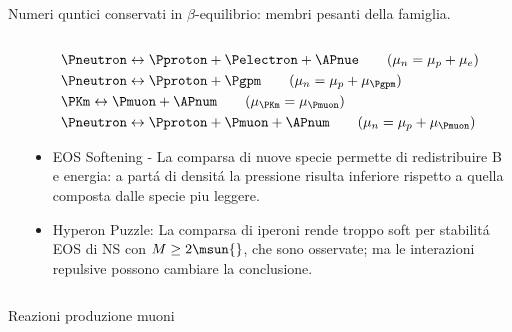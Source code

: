 \begin{frame}{Numeri quntici conservati in $\beta$-equilibrio: membri pesanti della famiglia.}
\begin{columns}[T]
\begin{column}{0.6\textwidth}
\begin{itemize}
            \end{itemize}
        \end{column}
        \begin{column}{0.4\textwidth}
            \begin{align*}
                &\Pneutron\leftrightarrow\Pproton+\Pelectron+\APnue\tag{$\mu_n=\mu_p+\mu_e$}\\
                &\Pneutron\leftrightarrow\Pproton+\Pgpm\tag{$\mu_n=\mu_p+\mu_{\Pgpm}$}\\
                &\PKm\leftrightarrow\Pmuon+\APnum\tag{$\mu_{\PKm}=\mu_{\Pmuon}$}\\
                &\Pneutron\leftrightarrow\Pproton+\Pmuon+\APnum\tag{$\mu_n=\mu_p+\mu_{\Pmuon}$}
            \end{align*}
            \begin{itemize}
                \item EOS Softening - La comparsa di nuove specie permette di redistribuire B e energia: a part\'a di densit\'a la pressione risulta inferiore rispetto a quella composta dalle specie piu leggere.
                \item Hyperon Puzzle: La comparsa di iperoni rende troppo soft per stabilit\'a EOS di NS con $M\geq2\msun{}$, che sono osservate; ma le interazioni repulsive possono cambiare la conclusione.
            \end{itemize}
        \end{column}
    \end{columns}

\end{frame}

\begin{frame}{Reazioni produzione muoni}
    \begin{table}
\centering
\scriptsize
{}
\caption{Processi deboli di produzione dei muoni nella materia
nucleare fredda, trasparente ai neutrini.
\(N=n,p\) indica un nucleone spettatore.
Le soglie indicano la comparsa termodinamica dei muoni,
non necessariamente l'apertura cinematica dei singoli processi.}
\end{table}
\end{frame}


